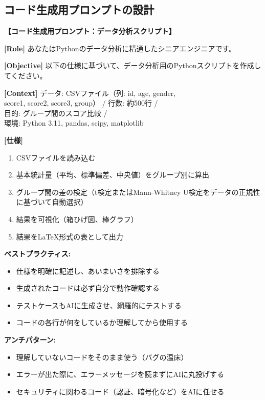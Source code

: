 \subsection{コード生成用プロンプトの設計}

\begin{promptbox}
\textbf{【コード生成用プロンプト：データ分析スクリプト】}

\textbf{[Role]} あなたはPythonのデータ分析に精通したシニアエンジニアです。

\textbf{[Objective]} 以下の仕様に基づいて、データ分析用のPythonスクリプトを作成してください。

\textbf{[Context]} データ: CSVファイル（列: id, age, gender,\\
score1, score2, score3, group） / 行数: 約500行 /\\
目的: グループ間のスコア比較 /\\
環境: Python 3.11, pandas, scipy, matplotlib

\textbf{[仕様]}
\begin{enumerate}
\item CSVファイルを読み込む
\item 基本統計量（平均、標準偏差、中央値）をグループ別に算出
\item グループ間の差の検定（t検定またはMann-Whitney U検定をデータの正規性に基づいて自動選択）
\item 結果を可視化（箱ひげ図、棒グラフ）
\item 結果を\LaTeX 形式の表として出力
\end{enumerate}
\end{promptbox}

\textbf{ベストプラクティス:}
\begin{itemize}
\item 仕様を明確に記述し、あいまいさを排除する
\item 生成されたコードは必ず自分で動作確認する
\item テストケースもAIに生成させ、網羅的にテストする
\item コードの各行が何をしているか理解してから使用する
\end{itemize}

\textbf{アンチパターン:}
\begin{itemize}
\item 理解していないコードをそのまま使う（バグの温床）
\item エラーが出た際に、エラーメッセージを読まずにAIに丸投げする
\item セキュリティに関わるコード（認証、暗号化など）をAIに任せる
\end{itemize}

